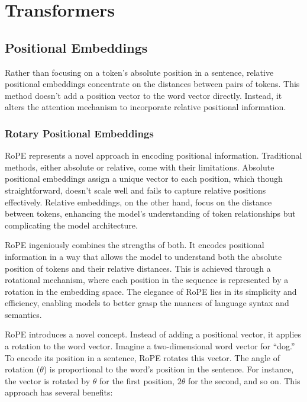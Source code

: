 \chapter{Transformers}

\section{Positional Embeddings}
\label{sec:transformer:posemb}

Rather than focusing on a token's absolute position in a sentence, relative positional embeddings concentrate on the distances between pairs of tokens. This method doesn't add a position vector to the word vector directly. Instead, it alters the attention mechanism to incorporate relative positional information.

\subsection{Rotary Positional Embeddings}
RoPE represents a novel approach in encoding positional information. Traditional methods, either absolute or relative, come with their limitations. Absolute positional embeddings assign a unique vector to each position, which though straightforward, doesn't scale well and fails to capture relative positions effectively. Relative embeddings, on the other hand, focus on the distance between tokens, enhancing the model’s understanding of token relationships but complicating the model architecture.

RoPE ingeniously combines the strengths of both. It encodes positional information in a way that allows the model to understand both the absolute position of tokens and their relative distances. This is achieved through a rotational mechanism, where each position in the sequence is represented by a rotation in the embedding space. The elegance of RoPE lies in its simplicity and efficiency, enabling models to better grasp the nuances of language syntax and semantics.

RoPE introduces a novel concept. Instead of adding a positional vector, it applies a rotation to the word vector. Imagine a two-dimensional word vector for ``dog.'' To encode its position in a sentence, RoPE rotates this vector. The angle of rotation ($\theta$) is proportional to the word's position in the sentence. For instance, the vector is rotated by $\theta$ for the first position, $2\theta$ for the second, and so on. This approach has several benefits:

